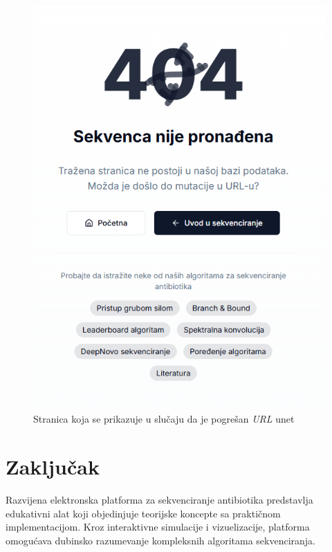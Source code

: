 \documentclass[12pt,oneside]{memoir}
\begin{document}
\begin{figure}[H]
\centering
\includegraphics[height=0.5\textheight]{images/wrong_page.png}
\caption{Stranica koja se prikazuje u slučaju da je pogrešan \emph{URL} unet}
\label{fig:wrong_page}
\end{figure}

\chapter{Zaključak}

Razvijena elektronska platforma za sekvenciranje antibiotika predstavlja edukativni alat koji objedinjuje teorijske koncepte sa praktičnom implementacijom. Kroz interaktivne simulacije i vizuelizacije, platforma omogućava dubinsko razumevanje kompleksnih algoritama sekvenciranja.
\end{document}
